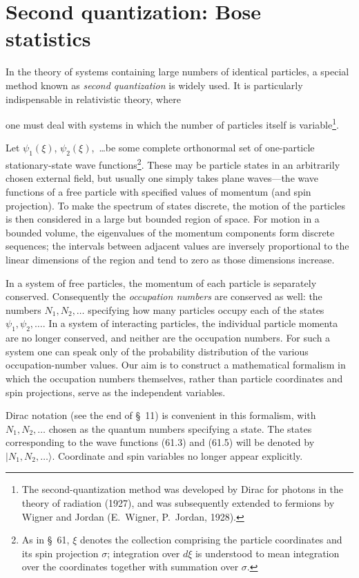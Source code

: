 \section{Second quantization: Bose statistics}

In the theory of systems containing large numbers of identical particles, a special method known as \emph{second quantization} is widely used. It is particularly indispensable in relativistic theory, where

one must deal with systems in which the number of particles itself is variable\footnote{The second-quantization method was developed by Dirac for photons in the theory of radiation (1927), and was subsequently extended to fermions by Wigner and Jordan (E.~Wigner, P.~Jordan, 1928).}.

Let $\psi_1(\xi)$, $\psi_2(\xi)$,~\dots be some complete orthonormal set of one-particle stationary-state wave functions\footnote{As in §~61, $\xi$ denotes the collection comprising the particle coordinates and its spin projection $\sigma$; integration over $d\xi$ is understood to mean integration over the coordinates together with summation over $\sigma$.}. These may be particle states in an arbitrarily chosen external field, but usually one simply takes plane waves---the wave functions of a free particle with specified values of momentum (and spin projection). To make the spectrum of states discrete, the motion of the particles is then considered in a large but bounded region of space. For motion in a bounded volume, the eigenvalues of the momentum components form discrete sequences; the intervals between adjacent values are inversely proportional to the linear dimensions of the region and tend to zero as those dimensions increase.

In a system of free particles, the momentum of each particle is separately conserved. Consequently the \emph{occupation numbers} are conserved as well: the numbers $N_1,N_2,\ldots$ specifying how many particles occupy each of the states $\psi_1,\psi_2,\ldots$. In a system of interacting particles, the individual particle momenta are no longer conserved, and neither are the occupation numbers. For such a system one can speak only of the probability distribution of the various occupation-number values. Our aim is to construct a mathematical formalism in which the occupation numbers themselves, rather than particle coordinates and spin projections, serve as the independent variables.

Dirac notation (see the end of §~11) is convenient in this formalism, with $N_1,N_2,\ldots$ chosen as the quantum numbers specifying a state. The states corresponding to the wave functions (61.3) and (61.5) will be denoted by $|N_1,N_2,\ldots\rangle$. Coordinate and spin variables no longer appear explicitly.


